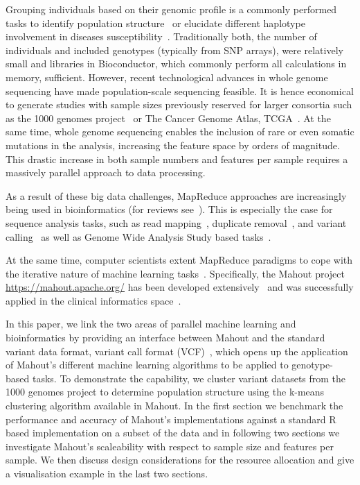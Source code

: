 \documentclass{bioinfo}
\begin{document}
Grouping individuals based on their genomic profile is a commonly performed tasks to identify population structure~\citep{Gao2007} or elucidate different haplotype involvement in diseases susceptibility~\citep{Laitman2013}.  
Traditionally both, the number of individuals and included genotypes (typically from SNP arrays), were relatively small and libraries in Bioconductor, which commonly perform all calculations in memory, sufficient. 
However, recent technological advances in whole genome sequencing have made population-scale sequencing feasible. 
It is hence economical to generate studies with sample sizes previously reserved for larger consortia such as the 1000 genomes project~\citep{1KG2012} or The Cancer Genome Atlas, TCGA~\citep{TCGA2013}. 
At the same time, whole genome sequencing enables the inclusion of rare or even somatic mutations in the analysis, increasing the feature space by orders of magnitude. This drastic increase in both sample numbers and features per sample requires a massively parallel approach to data processing. 

As a result of these big data challenges, MapReduce approaches are increasingly being used in bioinformatics (for reviews see~\citep{Zou2013, Qiu2010,Taylor2010}). This is especially the case for sequence analysis tasks, such as read mapping~\citep{Schatz2009}, duplicate removal~\citep{Jourdren2012}, and variant calling~\citep{Langmead2009, McKenna2010} as well as Genome Wide Analysis Study based tasks~\citep{Huang2013, Guo2014}.

At the same time, computer scientists extent MapReduce paradigms to cope with the iterative nature of machine learning tasks~\citep{Chu2009}. Specifically, the Mahout project \url{https://mahout.apache.org/} has been developed extensively~\citep{Ranger2007, Owen2011} and was successfully applied in the clinical informatics space~\citep{Dong2013}.

In this paper, we link the two areas of parallel machine learning and bioinformatics by providing an interface between Mahout and the standard variant data format, variant call format (VCF)~\citep{1KG2012}, which opens up the application of Mahout's different machine learning algorithms to be applied to genotype-based tasks. 
To demonstrate the capability, we cluster variant datasets from the 1000 genomes project to determine population structure using the k-means clustering algorithm available in Mahout. In the first section we benchmark the performance and accuracy of Mahout's implementations against a standard R based implementation on a subset of the data and in following two sections we investigate Mahout's scaleability with respect to sample size and features per sample. We then discuss design considerations for the resource allocation and give a visualisation example in the last two sections.  
\end{document}
